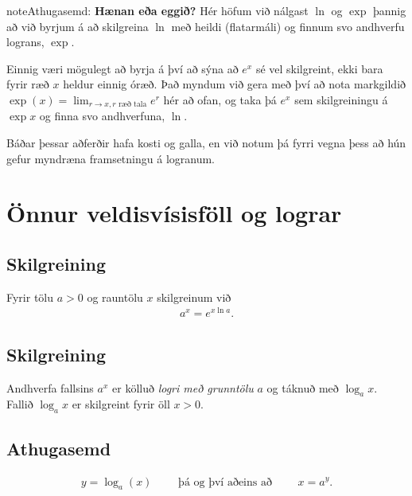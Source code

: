 \documentclass[a4paper,10pt,icelandic]{sphinxmanual}
\begin{document}
\begin{notice}{note}{Athugasemd:}
\textbf{Hænan eða eggið?} Hér höfum við nálgast \(\ln\) og \(\exp\)
þannig að við byrjum á að skilgreina \(\ln\) með heildi (flatarmáli)
og finnum svo andhverfu lograns, \(\exp\).

Einnig væri mögulegt að byrja á því að sýna að \(e^x\) sé vel
skilgreint, ekki bara fyrir ræð \(x\) heldur einnig óræð. Það myndum
við gera með því að nota markgildið
\(\exp(x)=\lim_{r\to x, r\text{ ræð tala}} e^r\)
hér að ofan, og taka þá \(e^x\) sem
skilgreiningu á \(\exp x\) og finna svo andhverfuna, \(\ln\).

Báðar þessar aðferðir hafa kosti og galla, en við notum þá fyrri vegna
þess að hún gefur myndræna framsetningu á logranum.
\end{notice}


\section{Önnur veldisvísisföll og lograr}
\label{kafli04:onnur-veldisvisisfoll-og-lograr}

\subsection{Skilgreining}
\label{kafli04:skilgreining}\label{kafli04:index-3}
Fyrir tölu \(a>0\) og rauntölu \(x\) skilgreinum við
\begin{equation*}
\begin{split}a^x=e^{x\ln a}.\end{split}
\end{equation*}

\subsection{Skilgreining}
\label{kafli04:id3}\label{kafli04:index-4}
Andhverfa fallsins \(a^x\) er kölluð \emph{logri með grunntölu} \(a\)
og táknuð með \(\log_a x\). Fallið \(\log_a x\) er skilgreint
fyrir öll \(x>0\).


\subsection{Athugasemd}
\label{kafli04:athugasemd}\begin{equation*}
\begin{split}y =\log_a(x)\qquad \text{ þá og því aðeins að } \qquad x = a^y.\end{split}
\end{equation*}
\end{document}
